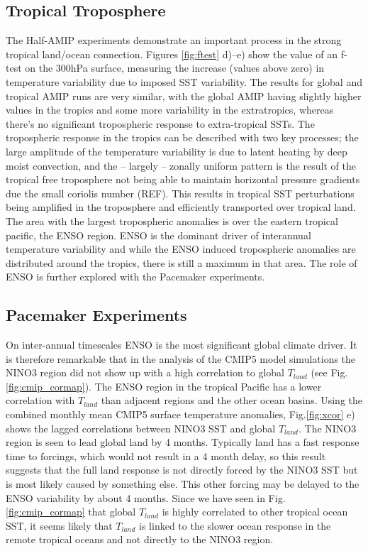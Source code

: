 \subsection{Tropical Troposphere}
The Half-AMIP experiments demonstrate an important process in the strong 
tropical land/ocean connection. Figures \ref{fig:ftest} d)--e) show the value of 
an f-test on the 300hPa surface, measuring the increase (values above zero) in 
temperature variability due to imposed SST variability. The results for global 
and tropical AMIP runs are very similar, with the global AMIP having slightly 
higher values in the tropics and some more variability in the extratropics, 
whereas there's no significant tropospheric response to extra-tropical SSTs.  
The tropospheric response in the tropics can be described with two key 
processes; the large amplitude of the temperature variability is due to latent 
heating by deep moist convection, and the -- largely -- zonally uniform pattern 
is the result of the tropical free troposphere not being able to maintain 
horizontal pressure gradients due the small coriolis number (REF). This results 
in tropical SST perturbations being amplified in the troposphere and efficiently 
transported over tropical land. The area with the largest tropospheric anomalies 
is over the eastern tropical pacific, the ENSO region. ENSO is the dominant 
driver of interannual temperature variability and while the ENSO induced 
tropospheric anomalies are distributed around the tropics, there is still a 
maximum in that area. The role of ENSO is further explored with the Pacemaker 
experiments.



\subsection{Pacemaker Experiments}


On inter-annual timescales ENSO is the most significant global climate driver. 
It is therefore remarkable that in the analysis of the CMIP5 model simulations 
the NINO3 region did not show up with a high correlation to global $T_{land}$ 
(see Fig.\ref{fig:cmip_cormap}). The ENSO region in the tropical Pacific has a 
lower correlation with $T_{land}$ than adjacent regions and the other ocean 
basins. Using the combined monthly mean CMIP5 surface temperature anomalies, 
Fig.\ref{fig:xcor} e) shows the lagged correlations between NINO3 SST and global 
$T_{land}$. The NINO3 region is seen to lead global land by 4 months.  Typically 
land has a fast response time to forcings, which would not result in a 
4 month delay, so this result suggests that the full land response is not 
directly forced by the NINO3 SST but is most likely caused by something else. 
This other forcing may be delayed to the ENSO variability by about 4 months. 
Since we have seen in Fig.\ref{fig:cmip_cormap} that global $T_{land}$ is highly 
correlated to other tropical ocean SST, it seems likely that $T_{land}$ is 
linked to the slower ocean response in the remote tropical oceans and not 
directly to the NINO3 region.

